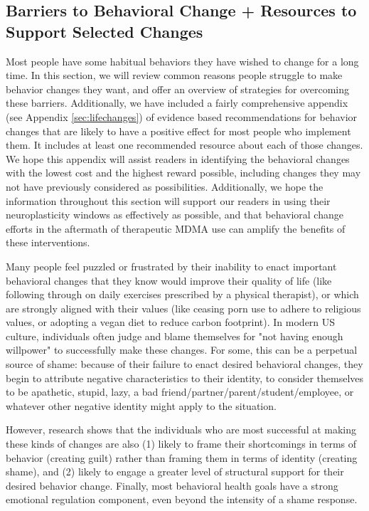 \documentclass[12pt,letterpaper]{book}
\begin{document}
\subsection*{Barriers to Behavioral Change + Resources to Support Selected Changes}

Most people have some habitual behaviors they have wished to change for a long time. In this section, we will review common reasons people struggle to make behavior changes they want, and offer an overview of strategies for overcoming these barriers. Additionally, we have included a fairly comprehensive appendix (see Appendix \ref{sec:lifechanges}) of evidence based recommendations for behavior changes that are likely to have a positive effect for most people who implement them. It includes at least one recommended resource about each of those changes. We hope this appendix will assist readers in identifying the behavioral changes with the lowest cost and the highest reward possible, including changes they may not have previously considered as possibilities. Additionally, we hope the information throughout this section will support our readers in using their neuroplasticity windows as effectively as possible, and that behavioral change efforts in the aftermath of therapeutic MDMA use can amplify the benefits of these interventions.

Many people feel puzzled or frustrated by their inability to enact important behavioral changes that they know would improve their quality of life (like following through on daily exercises prescribed by a physical therapist), or which are strongly aligned with their values (like ceasing porn use to adhere to religious values, or adopting a vegan diet to reduce carbon footprint). In modern US culture, individuals often judge and blame themselves for "not having enough willpower" to successfully make these changes. For some, this can be a perpetual source of shame: because of their failure to enact desired behavioral changes, they begin to attribute negative characteristics to their identity, to consider themselves to be apathetic, stupid, lazy, a bad friend/partner/parent/student/employee, or whatever other negative identity might apply to the situation.

However, research shows that the individuals who are most successful at making these kinds of changes are also (1) likely to frame their shortcomings in terms of behavior (creating guilt) rather than framing them in terms of identity (creating shame), and (2) likely to engage a greater level of structural support for their desired behavior change. Finally, most behavioral health goals have a strong emotional regulation component, even beyond the intensity of a shame response.
\end{document}
